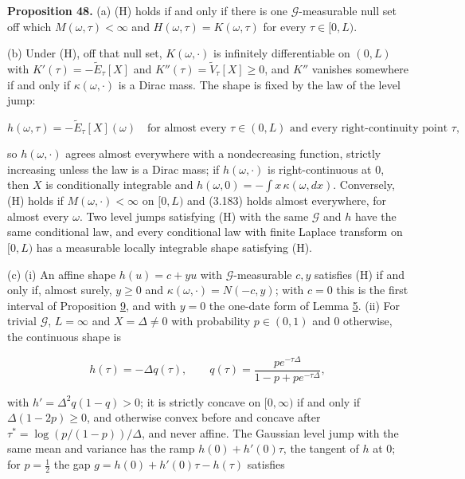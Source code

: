 \documentclass[11pt]{article}
\begin{document}
\label{res:Proposition-48}
\textbf{Proposition 48.} (a) (H) holds if and only if there is one \(\mathcal G\)-measurable null set off which \(M(\omega,\tau)<\infty\) and \(H(\omega,\tau)=K(\omega,\tau)\) for every \(\tau\in[0,L)\).

(b) Under (H), off that null set, \(K(\omega,\cdot)\) is infinitely differentiable on \((0,L)\) with \(K'(\tau)=-\tilde E_\tau[X]\) and \(K''(\tau)=\tilde V_\tau[X]\ge0\), and \(K''\) vanishes somewhere if and only if \(\kappa(\omega,\cdot)\) is a Dirac mass. The shape is fixed by the law of the level jump:

\begin{equation*}
h(\omega,\tau)=-\tilde E_\tau[X](\omega)\quad\text{for almost every }\tau\in(0,L)\text{ and every right-continuity point }\tau, \tag{3.183}\label{eq:3.183}
\end{equation*}

so \(h(\omega,\cdot)\) agrees almost everywhere with a nondecreasing function, strictly increasing unless the law is a Dirac mass; if \(h(\omega,\cdot)\) is right-continuous at \(0\), then \(X\) is conditionally integrable and \(h(\omega,0)=-\int x\,\kappa(\omega,dx)\). Conversely, (H) holds if \(M(\omega,\cdot)<\infty\) on \([0,L)\) and (3.183) holds almost everywhere, for almost every \(\omega\). Two level jumps satisfying (H) with the same \(\mathcal G\) and \(h\) have the same conditional law, and every conditional law with finite Laplace transform on \([0,L)\) has a measurable locally integrable shape satisfying (H).

(c) (i) An affine shape \(h(u)=c+yu\) with \(\mathcal G\)-measurable \(c,y\) satisfies (H) if and only if, almost surely, \(y\ge0\) and \(\kappa(\omega,\cdot)=N(-c,y)\); with \(c=0\) this is the first interval of Proposition \hyperref[res:Proposition-9]{9}, and with \(y=0\) the one-date form of Lemma \hyperref[res:Lemma-5]{5}. (ii) For trivial \(\mathcal G\), \(L=\infty\) and \(X=\Delta\neq0\) with probability \(p\in(0,1)\) and \(0\) otherwise, the continuous shape is

\begin{equation*}
h(\tau)=-\Delta q(\tau),\qquad q(\tau)=\frac{pe^{-\tau\Delta}}{1-p+pe^{-\tau\Delta}}, \tag{3.184}\label{eq:3.184}
\end{equation*}

with \(h'=\Delta^2q(1-q)>0\); it is strictly concave on \([0,\infty)\) if and only if \(\Delta(1-2p)\ge0\), and otherwise convex before and concave after \(\tau^*=\log(p/(1-p))/\Delta\), and never affine. The Gaussian level jump with the same mean and variance has the ramp \(h(0)+h'(0)\tau\), the tangent of \(h\) at \(0\); for \(p=\tfrac12\) the gap \(g=h(0)+h'(0)\tau-h(\tau)\) satisfies
\end{document}
